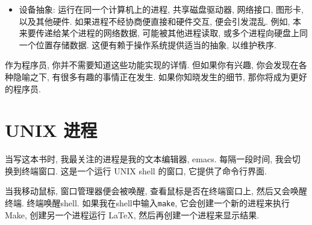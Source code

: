 \documentclass[12pt]{book}
\begin{document}
{\begin{itemize}
\item 设备抽象: 运行在同一个计算机上的进程, 共享磁盘驱动器, 网络接口, 
  图形卡, 以及其他硬件. 如果进程不经协商便直接和硬件交互, 便会引发混乱.
  例如, 本来要传递给某个进程的网络数据, 可能被其他进程读取, 
  或多个进程向硬盘上同一个位置存储数据.
  这便有赖于操作系统提供适当的抽象, 以维护秩序.

\end{itemize}
作为程序员, 你并不需要知道这些功能实现的详情.
但如果你有兴趣, 你会发现在各种隐喻之下, 
有很多有趣的事情正在发生.
如果你知晓发生的细节, 那你将成为更好的程序员.

\section{UNIX 进程}
\label{unixps}
当写这本书时, 我最关注的进程是我的文本编辑器, emacs.
每隔一段时间, 我会切换到终端窗口.
这是一个运行 UNIX shell 的窗口, 它提供了命令行界面.

当我移动鼠标, 窗口管理器便会被唤醒, 查看鼠标是否在终端窗口上,
然后又会唤醒终端. 终端唤醒shell. 
如果我在shell中输入{\tt make}, 
它会创建一个新的进程来执行 Make, 创建另一个进程运行 LaTeX,
然后再创建一个进程来显示结果.

}
\end{document}

